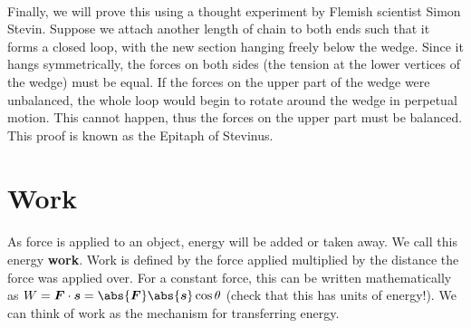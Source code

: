 \documentclass[../classical_mechanics.tex]{subfiles}
\begin{document}
\begin{example}
            \paragraph{}
            Finally, we will prove this using a thought experiment by Flemish scientist Simon Stevin.
            Suppose we attach another length of chain to both ends such that it forms a closed loop, with the new section hanging freely below the wedge.
            Since it hangs symmetrically, the forces on both sides (the tension at the lower vertices of the wedge) must be equal.
            If the forces on the upper part of the wedge were unbalanced, the whole loop would begin to rotate around the wedge in perpetual motion.
            This cannot happen, thus the forces on the upper part must be balanced.
            This proof is known as the Epitaph of Stevinus.
        \end{example}

    \section{Work}\label{sec:work}
        \paragraph{}
        As force is applied to an object, energy will be added or taken away.
        We call this energy \textbf{work}.
        Work is defined by the force applied multiplied by the distance the force was applied over.
        For a constant force, this can be written mathematically as $W=\vec{F}\cdot\vec{s}=\abs{\vec{F}}\abs{\vec{s}}\cos\theta$ (check that this has units of energy!).
        We can think of work as the mechanism for transferring energy.
        
\end{document}
